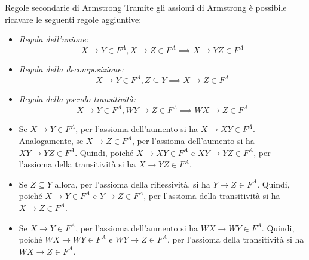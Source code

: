 \begin{Proposition}{Regole secondarie di Armstrong}{}
    Tramite gli assiomi di Armstrong è possibile ricavare le seguenti regole aggiuntive:
    \begin{itemize}
        \item \textit{Regola dell'unione:}
        \begin{equation*}
            X \to Y \in F^A, X \to Z \in F^A \implies X \to YZ \in F^A
        \end{equation*}
        \item \textit{Regola della decomposizione:}
        \begin{equation*}
            X \to Y \in F^A, Z \subseteq Y \implies X \to Z \in F^A
        \end{equation*}
        \item \textit{Regola della pseudo-transitività:}
        \begin{equation*}
            X \to Y \in F^A, WY \to Z \in F^A \implies WX \to Z \in F^A
        \end{equation*}
    \end{itemize}
    \begin{demonstration}\phantom{}
    \begin{itemize}
        \item Se $X\to Y\in F^A$, per l'assioma dell'aumento si ha $X\to XY\in F^A$. Analogamente, se $X\to Z\in F^A$, per l'assioma dell'aumento si ha $XY\to YZ\in F^A$. Quindi, poiché $X\to XY\in F^A$ e $XY\to YZ\in F^A$, per l'assioma della transitività si ha $X\to YZ\in F^A$.

        \item Se $Z\subseteq Y$ allora, per l'assioma della riflessività, si ha $Y\to Z\in F^A$. Quindi, poiché $X\to Y\in F^A$ e $Y\to Z\in F^A$, per l'assioma della transitività si ha $X\to Z\in F^A$.
        
        \item Se $X\to Y\in F^A$, per l'assioma dell'aumento si ha $WX\to WY\in F^A$. Quindi, poiché $WX\to WY\in F^A$ e $WY\to Z\in F^A$, per l'assioma della transitività si ha $WX\to Z\in F^A$.
    \end{itemize}
    \end{demonstration}
\end{Proposition}

